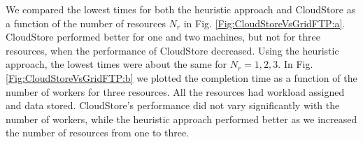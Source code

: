\documentclass{rspublic}
\begin{document}
We compared the lowest times for both the heuristic approach and
CloudStore as a function of the number of resources $N_r$ in Fig. 
\ref{Fig:CloudStoreVsGridFTP:a}. CloudStore performed better for one and
two machines, but not for three resources, when the performance of 
CloudStore decreased. Using the heuristic approach, the lowest times were about the
same for $N_r=1,2,3$. In Fig. \ref{Fig:CloudStoreVsGridFTP:b} we
plotted the completion time as a function of the number of workers for
three resources. All the resources had workload assigned and data
stored. CloudStore's performance did not vary significantly with the
number of workers, while the heuristic approach performed better as we
increased the number of resources from one to three.

\begin{figure}
\begin{center}
\end{center}
\end{figure}
\end{document}
